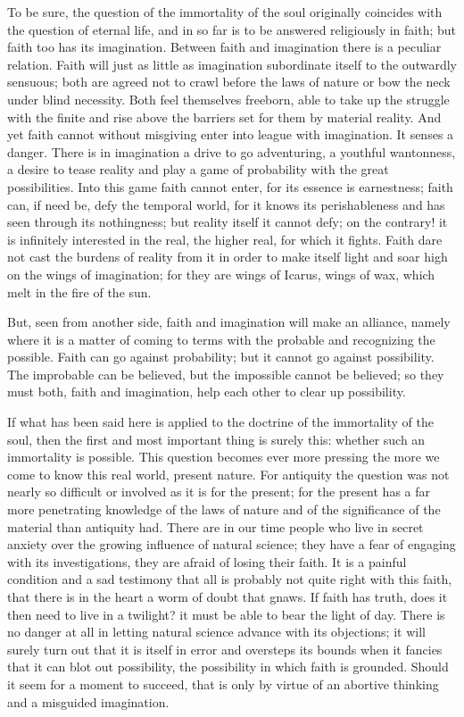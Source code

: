 \documentclass[12pt,a4paper,openany]{book}
\newcommand{\opage}[1]{\marginnote{\footnotesize\textit{[#1]}}}
\begin{document}
To be sure, the question of the immortality of the soul originally coincides with the question of eternal life, and in
so far is to be answered religiously in faith; but faith too has its imagination. Between faith and imagination there
is a peculiar relation. Faith will just as little as imagination subordinate itself to the outwardly sensuous; both are
agreed not to crawl before the laws of nature or bow the neck under blind necessity. Both feel themselves freeborn,
able to take up the struggle with the finite and rise above the barriers set for them by material reality. And yet
faith cannot without misgiving enter into league with imagination. It senses a danger. There is in imagination a drive
to go adventuring, a youthful wantonness, a desire to tease reality and play a game of probability with the great
possibilities. Into this game faith cannot enter, for its essence is earnestness; faith can, if need be, defy the
temporal world, for it knows its perishableness and has seen through its nothingness; but reality itself it cannot
defy; on the contrary! it is infinitely interested in the real, the higher real, for which it fights. Faith dare not
cast the burdens of reality from it in order to make itself light and soar high on the wings of imagination; for they
are wings of Icarus, wings of wax, which melt in the fire of the sun.

But, seen from another side, faith and imagination will make an alliance, namely where it is a matter of coming to
terms with the probable and recognizing the possible. Faith can go against probability; but it
\setcounter{footnote}{0}%
\opage{16}cannot go against possibility. The improbable can be believed, but the impossible cannot be believed; so they
must both, faith and imagination, help each other to clear up possibility.

If what has been said here is applied to the doctrine of the immortality of the soul, then the first and most important
thing is surely this: whether such an immortality is possible. This question becomes ever more pressing the more we
come to know this real world, present nature. For antiquity the question was not nearly so difficult or involved as it
is for the present; for the present has a far more penetrating knowledge of the laws of nature and of the significance
of the material than antiquity had. There are in our time people who live in secret anxiety over the growing influence
of natural science; they have a fear of engaging with its investigations, they are afraid of losing their faith. It is
a painful condition and a sad testimony that all is probably not quite right with this faith, that there is in the
heart a worm of doubt that gnaws. If faith has truth, does it then need to live in a twilight? it must be able to bear
the light of day. There is no danger at all in letting natural science advance with its objections; it will surely
turn out that it is itself in error and oversteps its bounds when it fancies that it can blot out possibility, the
possibility in which faith is grounded. Should it seem for a moment to succeed, that is only by virtue of an
abortive thinking and a misguided imagination.
\end{document}
